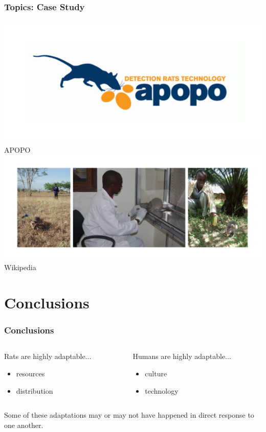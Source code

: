 \documentclass{beamer}
\begin{document}
\begin{frame}
\frametitle{Topics: Case Study}
\begin{center}
\includegraphics[width=.5\textwidth,trim={0 .45in 0 .45in}]{APOPOLogo}
\linebreak
{\tiny APOPO}
\linebreak
\linebreak
\includegraphics[width=.9\textwidth,trim={0 .45in 0 .45in}]{APOPOTraining}
\linebreak
{\tiny Wikipedia}
\end{center}
\end{frame}

\section[Conclusions]{Conclusions}

\begin{frame}
\frametitle{Conclusions}
\begin{columns}
\begin{column}{.5\textwidth}
Rats are highly adaptable...
\begin{itemize}
\item resources
\item distribution
\end{itemize}
\end{column}
\begin{column}{.5\textwidth}
Humans are highly adaptable...
\begin{itemize}
\item culture
\item technology
\end{itemize}
\end{column}
\end{columns}
\begin{center}
\end{center}
Some of these adaptations may or may not have happened in direct response to one another.
\end{frame}
\end{document}
